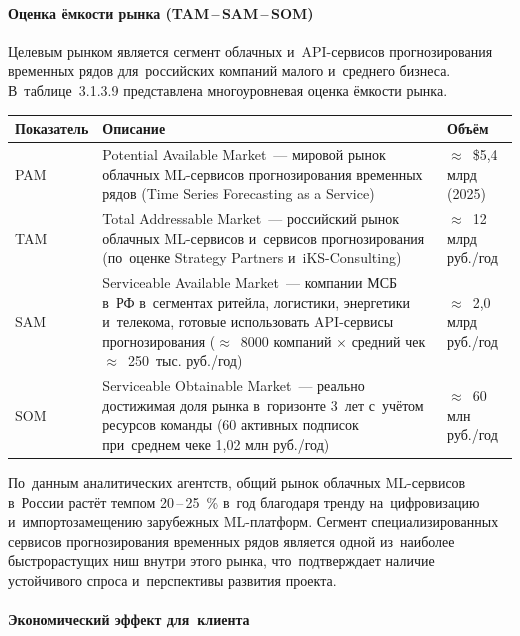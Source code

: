 \paragraph{Оценка ёмкости рынка (TAM\,--\,SAM\,--\,SOM)}

Целевым рынком является сегмент облачных и~API-сервисов прогнозирования
временных рядов для~российских компаний малого и~среднего бизнеса.
В~таблице~3.1.3.9 представлена многоуровневая оценка ёмкости рынка.

{\small
\begin{longtable}{C{1.2cm} L{10.5cm} L{2.8cm}}
\toprule
Показатель & Описание & Объём \\
\midrule
\endhead
PAM & Potential Available Market~--- мировой рынок облачных ML-сервисов прогнозирования временных рядов (Time Series Forecasting as a Service) & $\approx$~\$5,4 млрд (2025) \\
TAM & Total Addressable Market~--- российский рынок облачных ML-сервисов и~сервисов прогнозирования (по~оценке Strategy Partners и~iKS-Consulting) & $\approx$~12 млрд руб./год \\
SAM & Serviceable Available Market~--- компании МСБ в~РФ в~сегментах ритейла, логистики, энергетики и~телекома, готовые использовать API-сервисы прогнозирования ($\approx$~8000 компаний $\times$ средний чек $\approx$~250~тыс. руб./год) & $\approx$~2,0 млрд руб./год \\
SOM & Serviceable Obtainable Market~--- реально достижимая доля рынка в~горизонте 3~лет с~учётом ресурсов команды (60 активных подписок при~среднем чеке 1,02 млн руб./год) & $\approx$~60 млн руб./год \\
\bottomrule
\end{longtable}
}

По~данным аналитических агентств, общий рынок облачных ML-сервисов в~России
растёт темпом 20\,--\,25~\% в~год благодаря тренду на~цифровизацию
и~импортозамещению зарубежных ML-платформ. Сегмент специализированных сервисов
прогнозирования временных рядов является одной из~наиболее быстрорастущих ниш
внутри этого рынка, что~подтверждает наличие устойчивого спроса и~перспективы
развития проекта.

\paragraph{Экономический эффект для~клиента}

